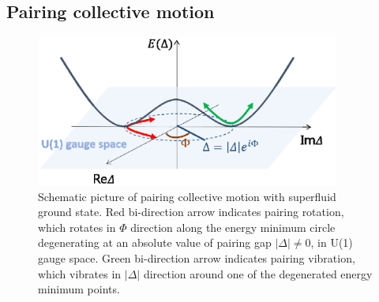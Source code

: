 \documentclass[11pt]{book} %
\begin{document}



\subsection{Pairing collective motion}
\label{1-1-2}

\begin{figure}[bt]
 \begin{center}
    \includegraphics[width=100mm]{images/pair_coll.eps}
 \end{center}
  \caption{Schematic picture of pairing collective motion with superfluid ground state. Red  bi-direction arrow indicates pairing rotation, which rotates in $\Phi$ direction along the energy minimum circle degenerating at an absolute value of pairing gap $|\Delta|\neq 0$, in U(1) gauge space. Green bi-direction arrow indicates pairing vibration, which vibrates in $|\Delta|$ direction around one of the degenerated energy minimum points.}
  \label{Pair_coll}
\end{figure}
\end{document}
